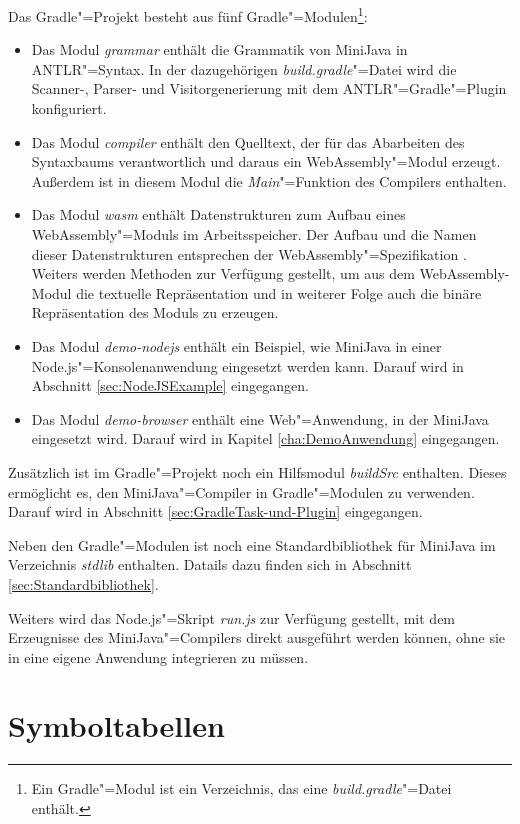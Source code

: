 Das Gradle"=Projekt besteht aus fünf Gradle"=Modulen\footnote{Ein Gradle"=Modul ist ein Verzeichnis, das eine \emph{build.gradle}"=Datei enthält.}:
\begin{itemize}
    \item Das Modul \emph{grammar} enthält die Grammatik von MiniJava in ANTLR"=Syntax. In der dazugehörigen \emph{build.gradle}"=Datei wird die Scanner-, Parser- und Visitorgenerierung mit dem ANTLR"=Gradle"=Plugin konfiguriert.
    \item Das Modul \emph{compiler} enthält den Quelltext, der für das Abarbeiten des Syntaxbaums verantwortlich und daraus ein WebAssembly"=Modul erzeugt. Außerdem ist in diesem Modul die \emph{Main}"=Funktion des Compilers enthalten.
    \item Das Modul \emph{wasm} enthält Datenstrukturen zum Aufbau eines WebAssembly"=Moduls im Arbeitsspeicher. Der Aufbau und die Namen dieser Datenstrukturen entsprechen der WebAssembly"=Spezifikation \cite{WebAssemblySpecification}. Weiters werden Methoden zur Verfügung gestellt, um aus dem WebAssembly-Modul die textuelle Repräsentation und in weiterer Folge auch die binäre Repräsentation des Moduls zu erzeugen.
    \item Das Modul \emph{demo-nodejs} enthält ein Beispiel, wie MiniJava in einer Node.js"=Konsolenanwendung eingesetzt werden kann. Darauf wird in Abschnitt \ref{sec:NodeJSExample} eingegangen.
    \item Das Modul \emph{demo-browser} enthält eine Web"=Anwendung, in der MiniJava eingesetzt wird. Darauf wird in Kapitel \ref{cha:DemoAnwendung} eingegangen.
\end{itemize}

Zusätzlich ist im Gradle"=Projekt noch ein Hilfsmodul \emph{buildSrc} enthalten. Dieses ermöglicht es, den MiniJava"=Compiler in Gradle"=Modulen zu verwenden. Darauf wird in Abschnitt \ref{sec:GradleTask-und-Plugin} eingegangen.

Neben den Gradle"=Modulen ist noch eine Standardbibliothek für MiniJava im Verzeichnis \emph{stdlib} enthalten. Datails dazu finden sich in Abschnitt \ref{sec:Standardbibliothek}.

Weiters wird das Node.js"=Skript \emph{run.js} zur Verfügung gestellt, mit dem Erzeugnisse des MiniJava"=Compilers direkt ausgeführt werden können, ohne sie in eine eigene Anwendung integrieren zu müssen.

\section{Symboltabellen}

